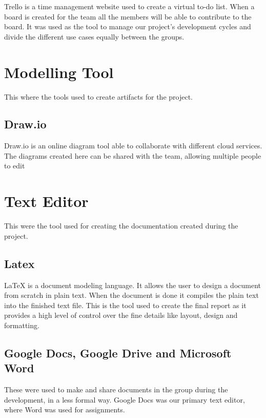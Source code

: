 Trello is a time management website used to create a virtual to-do list. When
 a board is created for the team all the members will be able to contribute to
  the board. It was used as the tool to manage our project’s development cycles
   and divide the different use cases equally between the groups.

\section{Modelling Tool}

This where the tools used to create artifacts for the project.

\subsection{Draw.io}

Draw.io is an online diagram tool able to collaborate with different cloud
 services. The diagrams created here can be shared with the team, allowing
  multiple people to edit

\section{Text Editor}

This were the tool used for creating the documentation created during
 the project.

\subsection{Latex}

 LaTeX is a document modeling language. It allows the user to design
  a document from scratch in plain text. When the document is done it compiles
   the plain text into the finished text file. This is the tool used to create
    the final report as it provides a high level of control over the fine
     details like layout, design and formatting.

\subsection{Google Docs, Google Drive and Microsoft Word}

These were used to make and share documents in the group during the
 development, in a less formal way. Google Docs was our primary text
  editor, where Word was used for assignments.
